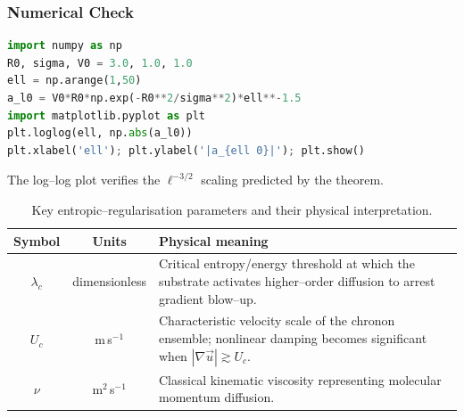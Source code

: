 \documentclass[12pt]{report}
\begin{document}
\subsubsection*{Numerical Check}
\begin{lstlisting}[language=Python]
import numpy as np
R0, sigma, V0 = 3.0, 1.0, 1.0
ell = np.arange(1,50)
a_l0 = V0*R0*np.exp(-R0**2/sigma**2)*ell**-1.5
import matplotlib.pyplot as plt
plt.loglog(ell, np.abs(a_l0))
plt.xlabel('ell'); plt.ylabel('|a_{ell 0}|'); plt.show()
\end{lstlisting}
The log–log plot verifies the $\ell^{-3/2}$ scaling predicted by the theorem.

\begin{table}[h]
    \centering
    \caption{Key entropic--regularisation parameters and their physical interpretation.}
    \label{tab:param_summary}
    \begin{tabular}{|c|c|p{7cm}|}
        \hline
        Symbol & Units & Physical meaning \\
        \hline
        $\lambda_c$ & dimensionless & Critical entropy/energy threshold at which the substrate activates higher--order diffusion to arrest gradient blow--up. \\
        $U_c$ & m\,s$^{-1}$ & Characteristic velocity scale of the chronon ensemble; nonlinear damping becomes significant when $|\nabla\vec u|\gtrsim U_c$. \\
        $\nu$ & m$^{2}$\,s$^{-1}$ & Classical kinematic viscosity representing molecular momentum diffusion. \\
        \hline
    \end{tabular}
\end{table}
\end{document}
